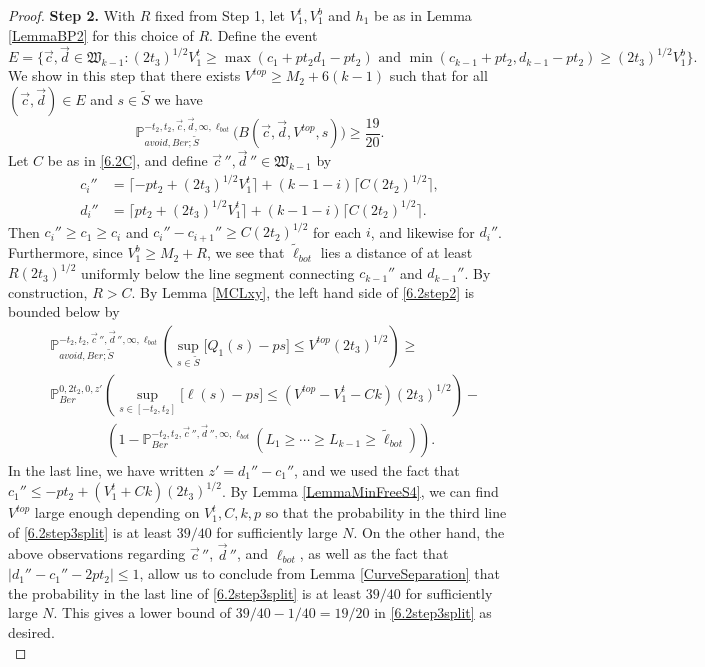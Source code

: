 \begin{proof}
	{\bf \raggedleft Step 2.} With $R$ fixed from Step 1, let $V_1^t, V_1^b$ and $h_1$ be as in Lemma \ref{LemmaBP2}  for this choice of $R$. Define the event
	$$E = \{ \vec{c}, \vec{d} \in \mathfrak{W}_{k-1}: (2t_3)^{1/2} V_1^t \geq \max(c_1 + p t_2 d_1 - pt_2) \mbox{ and }\min(c_{k-1} + p t_2, d_{k-1} - pt_2)  \geq (2t_3)^{1/2} V_1^b \}.$$
	We show in this step that there exists $V^{top} \geq M_2 + 6(k-1)$ such that for all $(\vec{c}, \vec{d}) \in E$ and $s\in\tilde{S}$ we have
	\begin{equation}\label{6.2step2}
	\mathbb{P}^{-t_2,t_2,\vec{c},\vec{d},\infty,\ell_{bot}}_{avoid,Ber;\tilde S}\big(B(\vec{c},\vec{d},V^{top},s)\big) \geq  \frac{19}{20}.
	\end{equation}
	Let $C$ be as in \eqref{6.2C}, and define $\vec{c}\,'', \vec{d}\,'' \in \mathfrak{W}_{k-1}$ by
	\begin{align*}
	c_i'' &= \lceil -pt_2 + (2t_3)^{1/2} V_1^t\rceil + (k-1-i)\lceil C(2t_2)^{1/2}\rceil,\\
	d_i'' &= \lceil pt_2 + (2t_3)^{1/2} V_1^t\rceil + (k-1-i)\lceil C(2t_2)^{1/2}\rceil.
	\end{align*}
	Then $c_i'' \geq c_1 \geq c_i$ and $c_i'' - c_{i+1}'' \geq C(2t_2)^{1/2}$ for each $i$, and likewise for $d_i''$. Furthermore, since $V_1^b \geq M_2+R$, we see that $\tilde{\ell}_{bot}$ lies a distance of at least $R(2t_3)^{1/2}$ uniformly below the line segment connecting $c_{k-1}''$ and $d_{k-1}''$. By construction, $R>C$. By Lemma \ref{MCLxy}, the left hand side of \eqref{6.2step2} is bounded below by
	\begin{equation}\label{6.2step3split}
	\begin{split}
	&\mathbb{P}^{-t_2,t_2,\vec{c}\,'', \vec{d}\,'', \infty,\ell_{bot}}_{avoid, Ber;\tilde S}\left(\sup_{s\in \tilde S}\big[Q_1(s) - ps\big] \leq V^{top}(2t_3)^{1/2}\right) \geq\\
	& \mathbb{P}^{0,2t_2,0,z'}_{Ber}\left(\sup_{s\in[-t_2,t_2]}\big[\ell(s) - ps\big] \leq (V^{top}-V_1^t-Ck)(2t_3)^{1/2}\right) -\\ &\qquad\qquad \left(1 - \mathbb{P}^{-t_2,t_2,\vec{c}\,'', \vec{d}\,'', \infty,\ell_{bot}}_{Ber}\left(L_1\geq\cdots\geq L_{k-1}\geq\tilde{\ell}_{bot}\right)\right).
	\end{split}
	\end{equation}
	In the last line, we have written $z' = d_1'' - c_1''$, and we used the fact that $c_1'' \leq -pt_2 + (V_1^t + Ck)(2t_3)^{1/2}$. By Lemma \ref{LemmaMinFreeS4}, we can find $V^{top}$ large enough depending on $V_1^t,C,k,p$ so that the probability in the third line of \eqref{6.2step3split} is at least $39/40$ for sufficiently large $N$. On the other hand, the above observations regarding $\vec{c}\,''$, $\vec{d}\,''$, and $\ell_{bot}$, as well as the fact that $|d_1'' - c_1'' - 2pt_2| \leq 1$, allow us to conclude from Lemma \ref{CurveSeparation} that the probability in the last line of \eqref{6.2step3split} is at least $39/40$ for sufficiently large $N$. This gives a lower bound of $39/40 - 1/40 = 19/20$ in \eqref{6.2step3split} as desired.\\
	

\end{proof}
